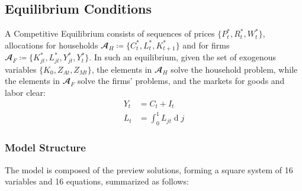 \documentclass[
	12pt, 
	]{article}
\numberwithin{equation}{section}
\DeclareMathOperator{\dif}{d}
\theoremstyle{definition}
\theoremstyle{plain}
\theoremstyle{plain}
\theoremstyle{plain}
\begin{document}

\subsection{Equilibrium Conditions}


A Competitive Equilibrium consists of sequences of prices $\{P_t^\ast, R_t^\ast, W_t^\ast\}$, allocations for households $\mathbfscr{A}_H \coloneq \{C_t^\ast, L_t^\ast, K_{t+1}^\ast\}$ and for firms $\mathbfscr{A}_F \coloneq \{K_{jt}^\ast, L_{jt}^\ast, Y_{jt}^\ast, Y_t^\ast\}$. In such an equilibrium, given the set of exogenous variables $\{K_0, Z_{At}, Z_{Mt}\}$, the elements in $\mathbfscr{A}_H$ solve the household problem, while the elements in $\mathbfscr{A}_F$ solve the firms' problems, and the markets for goods and labor clear:
\begin{align}
	Y_t &= C_t + I_t \label{eq:market-clearing-condition} \\
	L_t &= \int_{0}^{1} L_{jt} \dif j \label{eq:market-clearing-condition-2}
\end{align}



\subsubsection{Model Structure}

The model is composed of the preview solutions, forming a square system of 16 variables and 16 equations, summarized as follows:
\end{document}
